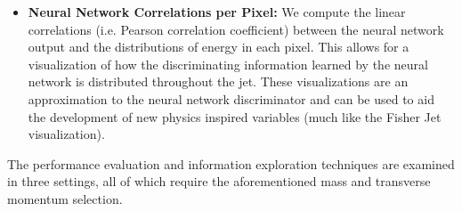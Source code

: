 \begin{itemize}
\item \textbf{Neural Network Correlations per Pixel:}  We compute the linear correlations (i.e. Pearson correlation coefficient) between the neural network output and the distributions of energy in each pixel.  This allows for a visualization of how the discriminating information learned by the neural network is distributed throughout the jet.  These visualizations are an approximation to the neural network discriminator and can be used to aid the development of new physics inspired variables (much like the Fisher Jet visualization).

\end{itemize}

\noindent The performance evaluation and information exploration techniques are examined in three settings, all of which require the aforementioned mass and transverse momentum selection.
